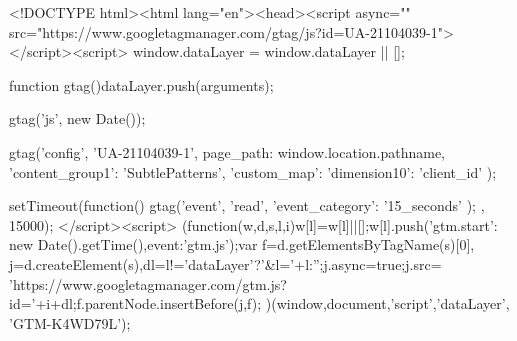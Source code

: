 <!DOCTYPE html><html lang="en"><head><script async="" src="https://www.googletagmanager.com/gtag/js?id=UA-21104039-1"></script><script>
            window.dataLayer = window.dataLayer || [];

            function gtag(){dataLayer.push(arguments);}

            gtag('js', new Date());

            gtag('config', 'UA-21104039-1', {
              page_path: window.location.pathname,
              'content_group1': 'SubtlePatterns',
              'custom_map': { 'dimension10': 'client_id' }
            });

            setTimeout(function() {
              gtag('event', 'read', { 'event_category': '15_seconds' });
          }, 15000);
          </script><script>
        (function(w,d,s,l,i){w[l]=w[l]||[];w[l].push({'gtm.start':
        new Date().getTime(),event:'gtm.js'});var f=d.getElementsByTagName(s)[0],
        j=d.createElement(s),dl=l!='dataLayer'?'&l='+l:'';j.async=true;j.src=
        'https://www.googletagmanager.com/gtm.js?id='+i+dl;f.parentNode.insertBefore(j,f);
        })(window,document,'script','dataLayer', 'GTM-K4WD79L');
